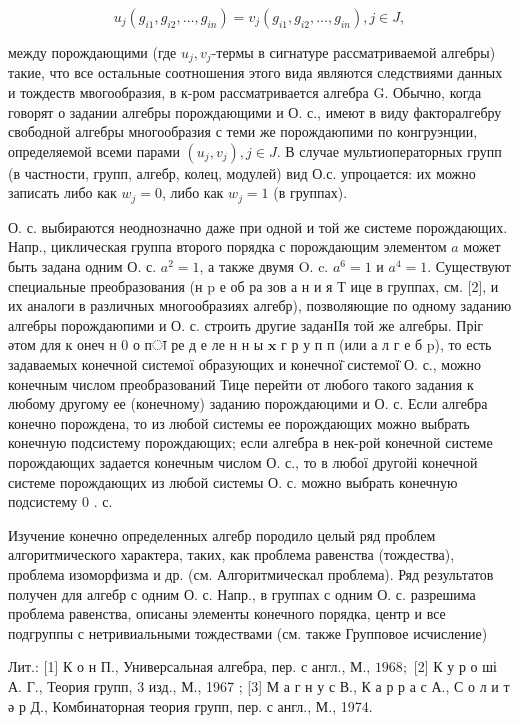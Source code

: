 \documentclass[10pt]{article}
\begin{document}
\[
u_{j}\left(g_{i 1}, g_{i 2}, \ldots, g_{i n}\right)=v_{j}\left(g_{i 1}, g_{i 2}, \ldots, g_{i n}\right), j \in J,
\]

между порождающими (где $u_{j}, v_{j}$-термы в сигнатуре рассматриваемой алгебры) такие, что все остальные соотношения этого вида являются следствиями данных и тождеств мвогообразия, в к-ром рассматривается алгебра G. Обычно, когда говорят о задании алгебры порождающими и О. с., имеют в виду факторалгебру свободной алгебры многообразия с теми же порождаюпими по конгруэнции, определяемой всеми парами $\left(u_{j}, v_{j}\right), j \in J$. В случае мультиоператорных групп (в частности, групп, алгебр, колец, модулей) вид О.с. упроцается: их можно записать либо как $w_{j}=0$, либо как $w_{j}=1$ (в группах).

О. с. выбираются неоднозначно даже при одной и той же системе порождающих. Напр., циклическая группа второго порядка с порождающим элементом $a$ может быть задана одним О. с. $a^{2}=1$, а также двумя O. c. $a^{6}=1$ и $a^{4}=1$. Существуют специальные преобразования (н $\mathrm{p}$ е об ра зов а н и я Т ице в группах, см. [2], и их аналоги в различных многообразиях алгебр), позволяющие по одному заданию алгебры порождаюпими и О. с. строить другие заданІІя той же алгебры. Пріг әтом для к онеч н 0 о пा ре д е ле н н ы $\mathbf{x}$ г р у п п (или а л г е б p), то есть задаваемых конечной системої образующих и конечної̈ системої̈ О. с., можно конечным числом преобразований Тице перейти от любого такого задания к любому другому ее (конечному) заданию порождаюцими и О. с. Если алгебра конечно порождена, то из любой системы ее порождающих можно выбрать конечную подсистему порождающих; если алгебра в нек-рой конечной системе порождающих задается конечным числом О. с., то в любої другойі конечной системе порождающих из любой системы О. с. можно выбрать конечную подсистему 0 . с.

Изучение конечно определенных алгебр породило целый ряд проблем алгоритмического характера, таких, как проблема равенства (тождества), проблема изоморфизма и др. (см. Алгоритмическал проблема). Ряд результатов получен для алгебр с одним О. с. Напр., в группах с одним О. с. разрешима проблема равенства, описаны элементы конечного порядка, центр и все подгруппы с нетривиальными тождествами (см. также Групповое исчисление)

Лит.: [1] К о н П., Универсальная алгебра, пер. с англ., М., $1968 ;$ [2] К у р о ші А. Г., Теория групп, 3 изд., М., 1967 ;
[3] М а г н у с В., К а р р а с А., С о л и т ә р Д., Комбинаторная теория групп, пер. с англ., М., 1974.
\end{document}
